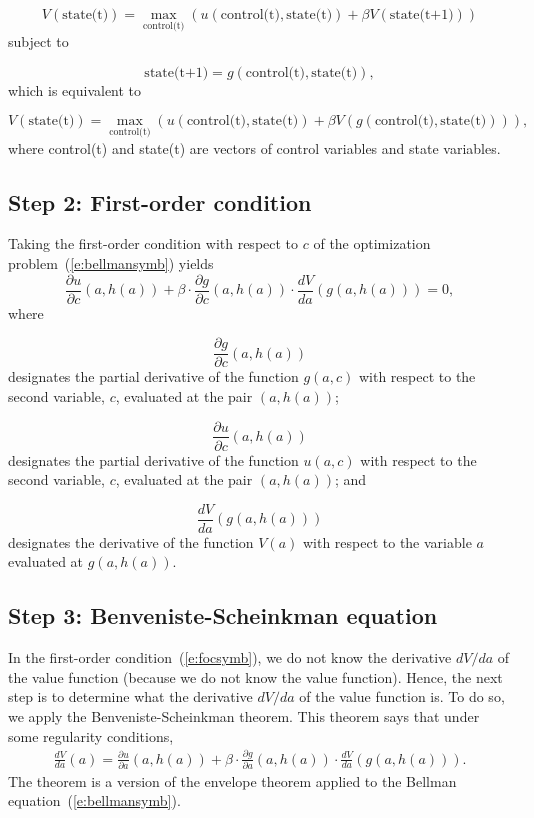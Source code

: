 \documentclass{article}
\begin{document}
\[
V(\text{state(t)}) = \max_{\text{control(t)}}\left(u(\text{control(t)},\text{state(t)})+\beta V(\text{state(t+1)})\right)
\]
subject to

\[
\text{state(t+1)} = g(\text{control(t)},\text{state(t)}),
\]
which is equivalent to

\[
V(\text{state(t)}) = \max_{\text{control(t)}}\left(u(\text{control(t)},\text{state(t)})+\beta V(g(\text{control(t)},\text{state(t)}))\right),
\]
where control(t) and state(t) are vectors of control variables and state variables.

\subsection{Step 2: First-order condition}

Taking the first-order condition with respect to $c$ of the optimization problem~(\ref{e:bellmansymb}) yields 
\wcSpan*[id=equation-35]{}
\setcounter{tpequation}{34}\label{e:focsymb}
\[
\frac{\partial u}{\partial c}(a,h(a))+\beta \cdot \frac{\partial g}{\partial c}(a,h(a)) \cdot \frac{d V}{d a}(g(a,h(a)))=0,\tag{35}
\]
where

\[
\frac{\partial g}{\partial c}(a,h(a))
\]
designates the partial derivative of the function $g(a,c)$ with respect to the second variable, $c$, evaluated at the pair $(a,h(a))$;


\[
\frac{\partial u}{\partial c}(a,h(a))
\]
designates the partial derivative of the function $u(a,c)$ with respect to the second variable, $c$, evaluated at the pair $(a,h(a))$;
and 

\[
\frac{d V}{d a}(g(a,h(a)))
\]
designates the derivative of the function $V(a)$ with respect to the variable $a$ evaluated at $g(a,h(a))$.

\subsection{Step 3: Benveniste-Scheinkman equation}

In the first-order condition~(\ref{e:focsymb}), we do not know the derivative $d V/d a$ of the value function (because we do not know the value function). Hence, the next step is to determine what the derivative $d V/d a$ of the value function is. To do so, we apply the Benveniste-Scheinkman theorem. This theorem says that under some regularity conditions,
\wcSpan*[id=equation-36]{}
\setcounter{tpequation}{35}\label{e:BSET}
\[
\begin{align*}
\frac{d V}{d a}(a)=\frac{\partial u}{\partial a}(a,h(a))+\beta\cdot \frac{\partial g}{\partial a}(a,h(a))\cdot \frac{d V}{d a}(g(a,h(a))).\tag{36}
\end{align*}
\]
The theorem is a version of the envelope theorem applied to the Bellman equation~(\ref{e:bellmansymb}).
\end{document}
